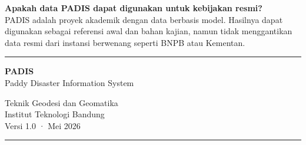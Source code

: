 \documentclass[12pt, a4paper]{article}
\begin{document}
  \medskip
  \textbf{Apakah data PADIS dapat digunakan untuk kebijakan resmi?}\\
  PADIS adalah proyek akademik dengan data berbasis model. Hasilnya dapat digunakan
  sebagai referensi awal dan bahan kajian, namun tidak menggantikan data resmi dari
  instansi berwenang seperti BNPB atau Kementan.

  \newpage

  \vspace*{3cm}
  \begin{center}
    {\color{padisaccent}\rule{4cm}{0.8pt}}

    \vspace{1cm}
    {\sffamily\bfseries\large\color{padisdark} PADIS}\\[6pt]
    {\sffamily\small\color{padismuted} Paddy Disaster Information System}

    \vspace{0.8cm}
    {\sffamily\footnotesize\color{padismuted}
      Teknik Geodesi dan Geomatika\\
      Institut Teknologi Bandung\\[8pt]
      Versi 1.0 · Mei 2026
    }

    \vspace{1cm}
    {\color{padisaccent}\rule{4cm}{0.8pt}}
  \end{center}

  
\end{document}
